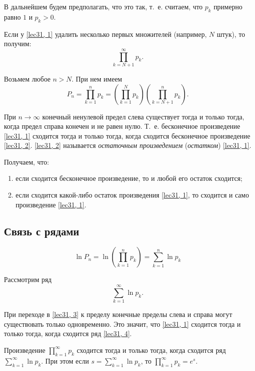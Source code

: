 \documentclass[../../main.tex]{subfiles}
\begin{document}
	В дальнейшем будем предполагать, что это так, т.~е. считаем, что $p_k$ 
	примерно равно 
	$1$ и $p_k > 0$.
		
	Если у \eqref{lec31, 1} удалить несколько первых множителей (например, $N$ 
	штук), то 
	получим:
	\begin{equation} \label{lec31, 2}
	\prod\limits_{k = N + 1}^{\infty} p_k.
	\end{equation}
		
	Возьмем любое $n > N$. При нем имеем \[P_n = \prod\limits_{k = 1}^{n} p_k = 
	\left(\prod\limits_{k = 1}^{N} p_k\right)\left(\prod\limits_{k = N + 
	1}^{n} p_k\right).\]
		
	При $n \to \infty$ конечный ненулевой предел слева существует тогда и только 
	тогда, когда предел справа конечен и не равен нулю. Т.~е. бесконечное 
	произведение \eqref{lec31, 1} сходится тогда и только тогда, когда сходится 
	бесконечное произведение \eqref{lec31, 2}. \eqref{lec31, 2} называется 
	\emph{остаточным произведением} (\emph{остатком}) \eqref{lec31, 1}.
		
	Получаем, что: 
	\begin{enumerate}[label={\alph*)}]
		\item если сходится бесконечное произведение, то и любой его остаток 
		сходится;
		\item если сходится какой-либо остаток произведения \eqref{lec31, 1}, то 
		сходится и само произведение \eqref{lec31, 1}.
		\end{enumerate}
	
	\subsection{Связь с рядами}
	
	\begin{equation}\label{lec31, 3}
	 \ln P_n = \ln \left(\prod\limits_{k = 1}^{n} p_k\right) = \sum\limits_{k = 
	 1}^{n} \ln p_k
	\end{equation}
	
	Рассмотрим ряд
	\begin{equation}\label{lec31, 4}
	\sum\limits_{k = 1}^{\infty} \ln p_k.
	\end{equation}
	
	При переходе в \eqref{lec31, 3} к пределу конечные пределы слева и справа 
	могут существовать только одновременно. Это значит, что \eqref{lec31, 1} 
	сходится тогда и только тогда, когда сходится ряд \eqref{lec31, 4}.
	
	\begin{thm}\label{lec31:thm1} 
		Произведение $\prod\limits_{k = 1}^{\infty} p_k$ сходится тогда и только 
		тогда, когда сходится ряд $\sum\limits_{k = 1}^{\infty} \ln p_k$. При этом 
		если $s = \sum\limits_{k = 1}^{\infty} \ln p_k$, то $\prod\limits_{k = 
		1}^{\infty} p_k = e^s$.
	\end{thm}
\end{document}
